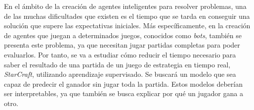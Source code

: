 
En el ámbito de la creación de agentes inteligentes para resolver problemas,
una de las muchas dificultades que existen es el tiempo que se tarda en conseguir
una solución que supere las expectativas iniciales. Más específicamente,
en la creación de agentes que juegan a determinados juegos, conocidos como
\emph{bots}, también se presenta este problema, ya que necesitan jugar
partidas completas para poder evaluarlos. Por tanto, se va a estudiar cómo
reducir el tiempo necesario para saber el resultado de una partida de un
juego de estrategia en tiempo real, \emph{StarCraft}, utilizando aprendizaje
supervisado. Se buscará un modelo que sea capaz de predecir el ganador sin jugar
toda la partida. Estos modelos deberían ser interpretables, ya que
también se busca explicar por qué un jugador gana a otro.


